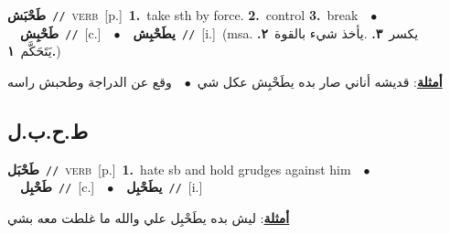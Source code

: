 \documentclass[10pt,a4paper,twoside]{article} %
\begin{document}
\begin{multicols}{2}
{\setlength\topsep{0pt}\textbf{\foreignlanguage{arabic}{طَحْبَش}}\ {\color{gray}\texttt{//}\color{black}}\ \textsc{verb}\ [p.]\ \textbf{1.}~take sth by force.  \textbf{2.}~control  \textbf{3.}~break\ \ $\bullet$\ \ \setlength\topsep{0pt}\textbf{\foreignlanguage{arabic}{طَحْبِش}}\ {\color{gray}\texttt{//}\color{black}}\ [c.]\ \ $\bullet$\ \ \setlength\topsep{0pt}\textbf{\foreignlanguage{arabic}{يطَحْبِش}}\ {\color{gray}\texttt{//}\color{black}}\ [i.]\ \color{gray}(msa. \foreignlanguage{arabic}{يكسر}~\foreignlanguage{arabic}{\textbf{٣.}}  .\foreignlanguage{arabic}{يأخذ شيء بالقوة}~\foreignlanguage{arabic}{\textbf{٢.}}  \foreignlanguage{arabic}{يَتَحَكَّم}~\foreignlanguage{arabic}{\textbf{١.}})\color{black}\  \begin{flushright}\color{gray}\foreignlanguage{arabic}{\textbf{\underline{\foreignlanguage{arabic}{أمثلة}}}: قديشه أناني صار بده يطَحْبِش عكل شي\ $\bullet$\ \  وقع عن الدراجة وطحبش راسه}\end{flushright}\color{black}} \vspace{2mm}

\vspace{-3mm}
\subsection*{\color{blue}\foreignlanguage{arabic}{ط.ح.ب.ل}\color{blue}{}} 

{\setlength\topsep{0pt}\textbf{\foreignlanguage{arabic}{طَحْبَل}}\ {\color{gray}\texttt{//}\color{black}}\ \textsc{verb}\ [p.]\ \textbf{1.}~hate sb and hold grudges against him\ \ $\bullet$\ \ \setlength\topsep{0pt}\textbf{\foreignlanguage{arabic}{طَحْبِل}}\ {\color{gray}\texttt{//}\color{black}}\ [c.]\ \ $\bullet$\ \ \setlength\topsep{0pt}\textbf{\foreignlanguage{arabic}{يطَحْبِل}}\ {\color{gray}\texttt{//}\color{black}}\ [i.]\  \begin{flushright}\color{gray}\foreignlanguage{arabic}{\textbf{\underline{\foreignlanguage{arabic}{أمثلة}}}: ليش بده يطَحْبِل علي والله ما غلطت معه بشي}\end{flushright}\color{black}} \vspace{2mm}


\end{multicols}
\end{document}
